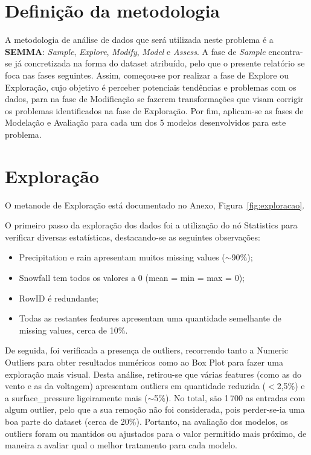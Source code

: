 \documentclass[11pt,a4paper]{article}
\newcommand{\code}[1]{{\ttfamily\hyphenchar\font=45\relax #1}}
\begin{document}
\section{Definição da metodologia}

A metodologia de análise de dados que será utilizada neste problema é a \textbf{SEMMA}: \textit{Sample}, \textit{Explore}, \textit{Modify}, \textit{Model} e \textit{Assess}. A fase de \textit{Sample} encontra-se já concretizada na forma do dataset atribuído, pelo que o presente relatório se foca nas fases seguintes. Assim, começou-se por realizar a fase de Explore ou Exploração, cujo objetivo é perceber potenciais tendências e problemas com os dados, para na fase de Modificação se fazerem transformações que visam corrigir os problemas identificados na fase de Exploração. Por fim, aplicam-se as fases de Modelação e Avaliação para cada um dos 5 modelos desenvolvidos para este problema.

\section{Exploração}

O metanode de Exploração está documentado no Anexo, Figura~\ref{fig:exploracao}.

O primeiro passo da exploração dos dados foi a utilização do nó \code{Statistics} para verificar diversas estatísticas, destacando-se as seguintes observações:

\begin{itemize}
    \item \code{Precipitation} e \code{rain} apresentam muitos missing values ($\sim$90\%);
    \item \code{Snowfall} tem todos os valores a 0 (mean = min = max = 0);
    \item \code{RowID} é redundante;
    \item Todas as restantes features apresentam uma quantidade semelhante de missing values, cerca de 10\%.
\end{itemize}

De seguida, foi verificada a presença de outliers, recorrendo tanto a \code{Numeric Outliers} para obter resultados numéricos como ao \code{Box Plot} para fazer uma exploração mais visual. Desta análise, retirou-se que várias features (como as do vento e as da voltagem) apresentam outliers em quantidade reduzida ($<$2,5\%) e a \code{surface\_pressure} ligeiramente mais ($\sim$5\%). No total, são 1\,700 as entradas com algum outlier, pelo que a sua remoção não foi considerada, pois perder-se-ia uma boa parte do dataset (cerca de 20\%). Portanto, na avaliação dos modelos, os outliers foram ou mantidos ou ajustados para o valor permitido mais próximo, de maneira a avaliar qual o melhor tratamento para cada modelo.
\end{document}
